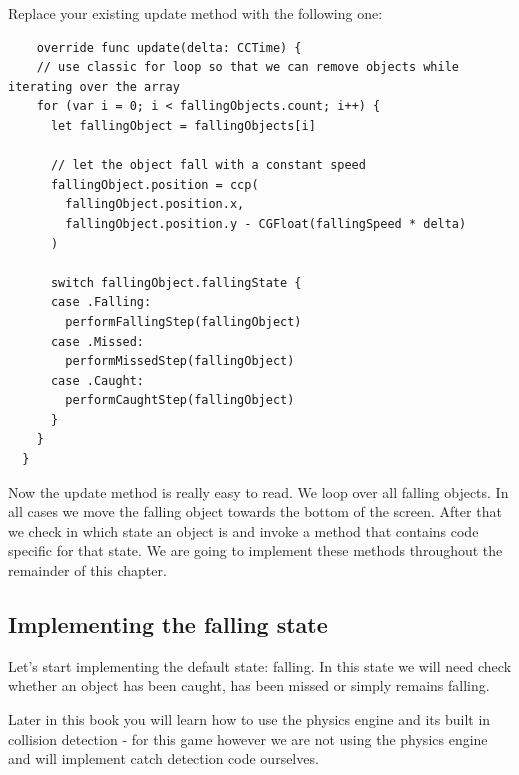 \begin{leftbar}
Replace your existing update method with the following one:
\begin{lstlisting}
    override func update(delta: CCTime) {
    // use classic for loop so that we can remove objects while iterating over the array
    for (var i = 0; i < fallingObjects.count; i++) {
      let fallingObject = fallingObjects[i]
      
      // let the object fall with a constant speed
      fallingObject.position = ccp(
        fallingObject.position.x,
        fallingObject.position.y - CGFloat(fallingSpeed * delta)
      )
      
      switch fallingObject.fallingState {
      case .Falling:
        performFallingStep(fallingObject)
      case .Missed:
        performMissedStep(fallingObject)
      case .Caught:
        performCaughtStep(fallingObject)
      }
    }
  }
\end{lstlisting}
\end{leftbar} 
Now the update method is really easy to read. We loop over all falling objects.
In all cases we move the falling object towards the bottom of the screen. After
that we check in which state an object is and invoke a method that contains code
specific for that state. We are going to implement these methods throughout the
remainder of this chapter.

\subsection{Implementing the falling state}
Let's start implementing the default state: falling. In this state we will need
check whether an object has been caught, has been missed or simply remains
falling. 

Later in this book you will learn how to use the \cocos{} physics
engine and its built in collision detection - for this game however we are not
using the physics engine and will implement catch detection code ourselves.

